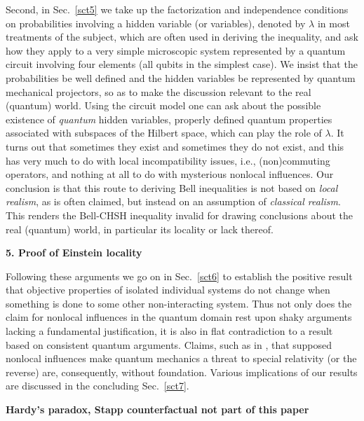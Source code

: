 \documentclass[12pt]{article} %
\def\outl#1{\par{\medskip\noindent\hspace*{.5cm}\bf
      \mathversion{bold}#1\mathversion{normal}\smallskip} }
\def\np{} \def\xa{} \def\xb{} \def\xn{} \def\xp{}
\def\outl#1{} \def\np{} \def\xa{} \def\xb{} \def\xn{} \def\xp{}
\def\outl#1{\par{\medskip\noindent\hspace*{.5cm}\bf
      \mathversion{bold}#1\mathversion{normal}\smallskip} }
\def\np{\newpage }\def\xn{\nopagebreak }\def\xp{\pagebreak }
\newcommand{\lm}{\lambda }
\begin{document}
Second, in Sec.~\ref{sct5} we take up the factorization and independence
conditions on probabilities involving a hidden variable (or variables),
denoted by $\lm$ in most treatments of the subject, which are often used in
deriving the inequality, and ask how they apply to a very simple microscopic
system represented by a quantum circuit involving four elements (all qubits in
the simplest case).  We insist that the probabilities be well defined and the
hidden variables be represented by quantum mechanical projectors, so as to
make the discussion relevant to the real (quantum) world.  Using the circuit
model one can ask about the possible existence of \emph{quantum} hidden
variables, properly defined quantum properties associated with subspaces of
the Hilbert space, which can play the role of $\lm$.  It turns out that
sometimes they exist and sometimes they do not exist, and this has very much
to do with local incompatibility issues, i.e., (non)commuting operators, and
nothing at all to do with mysterious nonlocal influences.  Our conclusion is
that this route to deriving Bell inequalities is not based on \emph{local
  realism}, as is often claimed, but instead on an assumption of
\emph{classical realism}.  This renders the Bell-CHSH inequality invalid for
drawing conclusions about the real (quantum) world, in particular its locality
or lack thereof.


\xb
\outl{5. Proof of Einstein locality}
\xa


Following these arguments we go on in Sec.~\ref{sct6} to establish the
positive result that objective properties of isolated individual systems do
not change when something is done to some other non-interacting system.  Thus
not only does the claim for nonlocal influences in the quantum domain rest
upon shaky arguments lacking a fundamental justification, it is also in flat
contradiction to a result based on consistent quantum arguments. Claims, such
as in \cite{Mdln02,AlGl09}, that supposed nonlocal influences make quantum
mechanics a threat to special relativity (or the reverse) are, consequently,
without foundation.
%
Various implications of our results are discussed in the concluding 
Sec.~\ref{sct7}.

\xb
\outl{Hardy's paradox, Stapp counterfactual not part of
  this paper}
\xa
\end{document}
